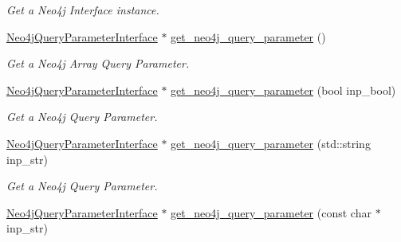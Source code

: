 \begin{DoxyCompactItemize}
\begin{DoxyCompactList}\small\item\em Get a Neo4j Interface instance. \end{DoxyCompactList}\item 
\hyperlink{classNeo4jQueryParameterInterface}{Neo4j\+Query\+Parameter\+Interface} $\ast$ \hyperlink{classNeo4jComponentFactory_afeb6cd6e4abc8dc9e7fe3c78be547848}{get\+\_\+neo4j\+\_\+query\+\_\+parameter} ()\hypertarget{classNeo4jComponentFactory_afeb6cd6e4abc8dc9e7fe3c78be547848}{}\label{classNeo4jComponentFactory_afeb6cd6e4abc8dc9e7fe3c78be547848}

\begin{DoxyCompactList}\small\item\em Get a Neo4j Array Query Parameter. \end{DoxyCompactList}\item 
\hyperlink{classNeo4jQueryParameterInterface}{Neo4j\+Query\+Parameter\+Interface} $\ast$ \hyperlink{classNeo4jComponentFactory_a266364dfe4f859bc05423cdb2f123eb4}{get\+\_\+neo4j\+\_\+query\+\_\+parameter} (bool inp\+\_\+bool)\hypertarget{classNeo4jComponentFactory_a266364dfe4f859bc05423cdb2f123eb4}{}\label{classNeo4jComponentFactory_a266364dfe4f859bc05423cdb2f123eb4}

\begin{DoxyCompactList}\small\item\em Get a Neo4j Query Parameter. \end{DoxyCompactList}\item 
\hyperlink{classNeo4jQueryParameterInterface}{Neo4j\+Query\+Parameter\+Interface} $\ast$ \hyperlink{classNeo4jComponentFactory_acb9610a42e4d8c8966bce29734838edc}{get\+\_\+neo4j\+\_\+query\+\_\+parameter} (std\+::string inp\+\_\+str)\hypertarget{classNeo4jComponentFactory_acb9610a42e4d8c8966bce29734838edc}{}\label{classNeo4jComponentFactory_acb9610a42e4d8c8966bce29734838edc}

\begin{DoxyCompactList}\small\item\em Get a Neo4j Query Parameter. \end{DoxyCompactList}\item 
\hyperlink{classNeo4jQueryParameterInterface}{Neo4j\+Query\+Parameter\+Interface} $\ast$ \hyperlink{classNeo4jComponentFactory_ae5341a48323f8f280ca2d7ee1e8f6764}{get\+\_\+neo4j\+\_\+query\+\_\+parameter} (const char $\ast$inp\+\_\+str)\hypertarget{classNeo4jComponentFactory_ae5341a48323f8f280ca2d7ee1e8f6764}{}\label{classNeo4jComponentFactory_ae5341a48323f8f280ca2d7ee1e8f6764}


\end{DoxyCompactItemize}
